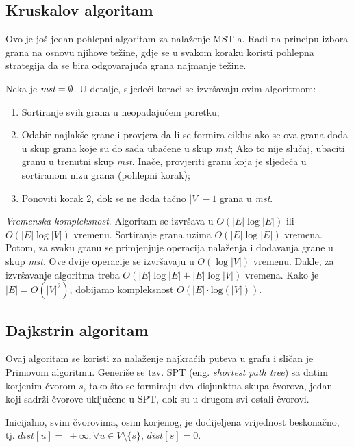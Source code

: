 \documentclass[a4paper, utf8, 11pt, colorlinks]{book}
\theoremstyle{definition}
\begin{document}
\subsection{Kruskalov algoritam}

Ovo je još jedan pohlepni algoritam za nalaženje MST-a. Radi na principu izbora grana na osnovu njihove težine, gdje se u svakom koraku koristi pohlepna strategija da se bira odgovarajuća grana najmanje težine.

 Neka je $\emph{mst} = \emptyset$. U detalje, sljedeći koraci se izvršavaju ovim algoritmom:

\begin{enumerate}
	\item Sortiranje svih grana u neopadajućem poretku;
	\item Odabir najlakše grane i provjera da li se formira ciklus ako se ova 
	grana doda u skup grana koje su do sada ubačene u skup \emph{mst}; Ako to nije slučaj, ubaciti granu u trenutni skup \emph{mst}. Inače, provjeriti  granu koja je sljedeća u sortiranom nizu grana (pohlepni korak);
	\item Ponoviti korak 2, dok se ne doda tačno $|V|-1$ grana u \emph{mst}.
\end{enumerate} 

\noindent \emph{Vremenska kompleksnost}. Algoritam se izvršava u $O(|E|\log |E|)$ ili $O(|E|\log |V|)$ vremenu. Sortiranje grana uzima $O(|E| \log|E|)$ vremena. Potom, za svaku granu 
se primjenjuje operacija nalaženja i dodavanja grane u skup \emph{mst}. Ove dvije operacije se izvršavaju u $O(\log |V|)$ vremenu. Dakle, za izvršavanje algoritma treba $O(|E|\log |E| + |E|\log |V|)$ vremena. Kako je $|E|=O(|V|^2)$, dobijamo kompleksnost $O(|E| \cdot \mathrm{log}(|V|))$. 

\subsection{Dajkstrin algoritam}

Ovaj algoritam se koristi za nalaženje najkraćih puteva u grafu i sličan je Primovom algoritmu. Generiše se tzv. SPT (eng. \emph{shortest path tree}) sa datim korjenim čvorom $s$, tako  što se formiraju dva disjunktna skupa čvorova, jedan koji sadrži čvorove uključene u SPT, dok su u drugom svi ostali čvorovi. 

Inicijalno, svim čvorovima, osim korjenog, je dodijeljena vrijednost beskonačno, tj. $dist[u]=\ +\infty, \forall u \in V\setminus \{s\}$, $dist[s]=0$. 
\end{document}
